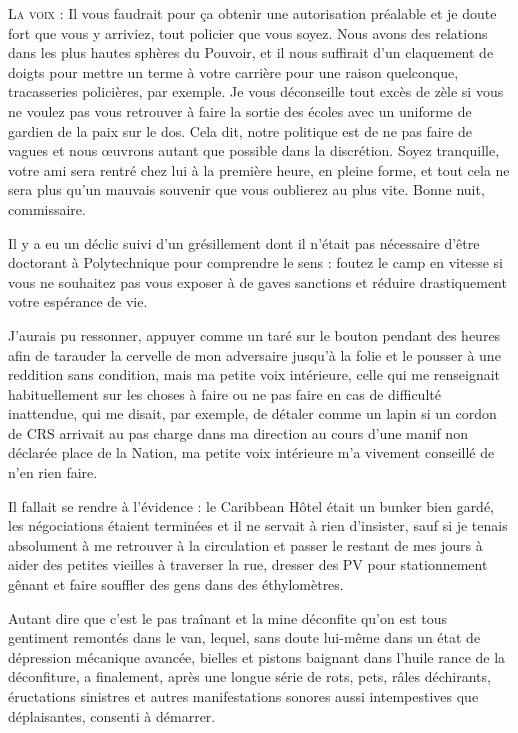 \begin{dialogue}
\textsc{La voix} : Il vous faudrait pour ça obtenir une autorisation préalable et je doute fort que vous y arriviez, tout policier que vous soyez. Nous avons des relations dans les plus hautes sphères du Pouvoir, et il nous suffirait d’un claquement de doigts pour mettre un terme à votre carrière pour une raison quelconque, tracasseries policières, par exemple. Je vous déconseille tout excès de zèle si vous ne voulez pas vous retrouver à faire la sortie des écoles avec un uniforme de gardien de la paix sur le dos. Cela dit, notre politique est de ne pas faire de vagues et nous œuvrons autant que possible dans la discrétion. Soyez tranquille, votre ami sera rentré chez lui à la première heure, en pleine forme, et tout cela ne sera plus qu’un mauvais souvenir que vous oublierez au plus vite. Bonne nuit, commissaire.

\end{dialogue}
    
Il y a eu un déclic suivi d’un grésillement dont il n’était pas nécessaire d’être doctorant à Polytechnique pour comprendre le sens : foutez le camp en vitesse si vous ne souhaitez pas vous exposer à de gaves sanctions et réduire drastiquement votre espérance de vie.

J’aurais pu ressonner, appuyer comme un taré sur le bouton pendant des heures afin de tarauder la cervelle de mon adversaire jusqu’à la folie et le pousser à une reddition sans condition, mais ma petite voix intérieure, celle qui me renseignait habituellement sur les choses à faire ou ne pas faire en cas de difficulté inattendue, qui me disait, par exemple, de détaler comme un lapin si un cordon de CRS arrivait au pas charge dans ma direction au cours d’une manif non déclarée place de la Nation, ma petite voix intérieure m’a vivement conseillé de n’en rien faire.

Il fallait se rendre à l’évidence : le Caribbean Hôtel était un bunker bien gardé, les négociations étaient terminées et il ne servait à rien d’insister, sauf si je tenais absolument à me retrouver à la circulation et passer le restant de mes jours à aider des petites vieilles à traverser la rue, dresser des PV pour stationnement gênant et faire souffler des gens dans des éthylomètres.

Autant dire que c’est le pas traînant et la mine déconfite qu’on est tous gentiment remontés dans le van, lequel, sans doute lui-même dans un état de dépression mécanique avancée, bielles et pistons baignant dans l’huile rance de la déconfiture, a finalement, après une longue série de rots, pets, râles déchirants, éructations sinistres et autres manifestations sonores aussi intempestives que déplaisantes, consenti à démarrer.

%
